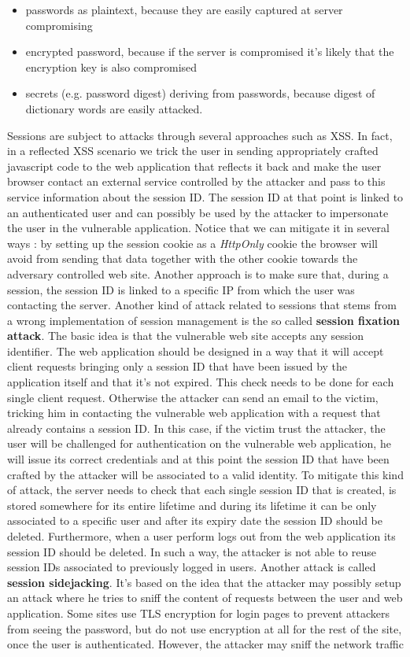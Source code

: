 \begin{itemize}
\item passwords as plaintext, because they are easily captured at server compromising
\item encrypted password, because if the server is compromised it's likely that the encryption key is also compromised
\item secrets (e.g. password digest) deriving from passwords, because digest of dictionary words are easily attacked.
\end{itemize} 
Sessions are subject to attacks through several approaches such as XSS. In fact, in a reflected XSS scenario we trick the user in sending appropriately crafted javascript code to the web application that reflects it back and make the user browser contact an external service controlled by the attacker and pass to this service information about the session ID. The session ID at that point is linked to an authenticated user and can possibly be used by the attacker to impersonate the user in the vulnerable application. Notice that we can mitigate it in several ways : by setting up the session cookie as a \textit{HttpOnly} cookie the browser will avoid from sending that data together with the other cookie towards the adversary controlled web site. Another approach is to make sure that, during a session, the session ID is linked to a specific IP from which the user was contacting the server. Another kind of attack related to sessions that stems from a wrong implementation of session management is the so called \textbf{session fixation attack}. The basic idea is that the vulnerable web site accepts any session identifier. The web application should be designed in a way that it will accept client requests bringing only a session ID that have been issued by the application itself and that it's not expired. This check needs to be done for each single client request. Otherwise the attacker can send an email to the victim, tricking him in contacting the vulnerable web application with a request that already contains a session ID. In this case, if the victim trust the attacker, the user will be challenged for authentication on the vulnerable web application, he will issue its correct credentials and at this point the session ID that have been crafted by the attacker will be associated to a valid identity. To mitigate this kind of attack, the server needs to check that each single session ID that is created, is stored somewhere for its entire lifetime and during its lifetime it can be only associated to a specific user and after its expiry date the session ID should be deleted. Furthermore, when a user perform logs out from the web application its session ID should be deleted. In such a way, the attacker is not able to reuse session IDs associated to previously logged in users. Another attack is called \textbf{session sidejacking}. It's based on the idea that the attacker may possibly setup an attack where he tries to sniff the content of requests between the user and web application. Some sites use TLS encryption for login pages to prevent attackers from seeing the password, but do not use encryption at all for the rest of the site, once the user is authenticated. However, the attacker may sniff the network traffic 